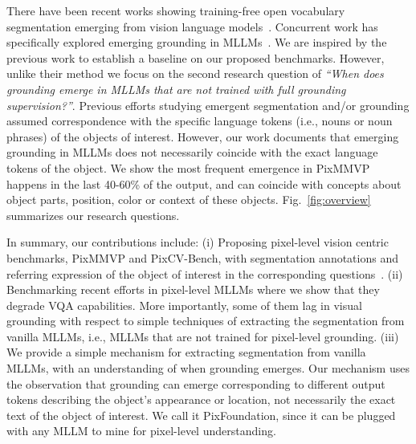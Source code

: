 There have been recent works showing training-free open vocabulary segmentation emerging from vision language models~\cite{wang2025sclip,luo2024emergent,hajimiri2024pay}. Concurrent work has specifically explored emerging grounding in MLLMs~\cite{cao2024emerging}. We are inspired by the previous work to establish a baseline on our proposed benchmarks. However, unlike their method we focus on the second research question of \textit{``When does grounding emerge in MLLMs that are not trained with full grounding supervision?''}. Previous efforts studying emergent segmentation and/or grounding assumed correspondence with the specific language tokens (i.e., nouns or noun phrases) of the objects of interest. However, our work documents that emerging grounding in MLLMs does not necessarily coincide with the exact language tokens of the object. We show the most frequent emergence in PixMMVP happens in the last 40-60\% of the output, and can coincide with concepts about object parts, position, color or context of these objects. Fig.~\ref{fig:overview} summarizes our research questions. 

In summary, our contributions include: (i) Proposing pixel-level vision centric benchmarks, PixMMVP and PixCV-Bench, with segmentation annotations and referring expression of the object of interest in the corresponding questions~\cite{tong2024cambrian,tong2024eyes}. (ii) Benchmarking recent efforts in pixel-level MLLMs where we show that they degrade VQA capabilities. More importantly, some of them lag in visual grounding with respect to simple techniques of extracting the segmentation from vanilla MLLMs, i.e., MLLMs that are not trained for pixel-level grounding. (iii) We provide a simple mechanism for extracting segmentation from vanilla MLLMs, with an understanding of when grounding emerges. Our mechanism uses the observation that grounding can emerge corresponding to different output tokens describing the object's appearance or location, not necessarily the exact text of the object of interest. We call it PixFoundation, since it can be plugged with any MLLM to mine for pixel-level understanding.

